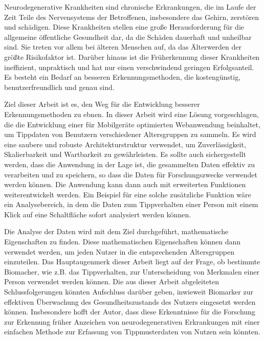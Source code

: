 Neurodegenerative Krankheiten sind chronische Erkrankungen, die im Laufe der Zeit Teile des Nervensystems der Betroffenen, insbesondere das Gehirn, zerstören und schädigen. 
Diese Krankheiten stellen eine große Herausforderung für die allgemeine öffentliche Gesundheit dar, da die Schäden dauerhaft und unheilbar sind. 
Sie treten vor allem bei älteren Menschen auf, da das Älterwerden der größte Risikofaktor ist. 
Darüber hinaus ist die Früherkennung dieser Krankheiten ineffizient, unpraktisch und hat nur einen verschwindend geringen Erfolgsanteil. 
Es besteht ein Bedarf an besseren Erkennungsmethoden, die kostengünstig, benutzerfreundlich und genau sind.

Ziel dieser Arbeit ist es, den Weg für die Entwicklung besserer Erkennungsmethoden zu ebnen.
In dieser Arbeit wird eine Lösung vorgeschlagen, die die Entwicklung einer für Mobilgeräte optimierten Webanwendung beinhaltet, um Tippdaten von Benutzern verschiedener Altersgruppen zu sammeln. 
Es wird eine saubere und robuste Architekturstruktur verwendet, um Zuverlässigkeit, Skalierbarkeit und Wartbarkeit zu gewährleisten. 
Es sollte auch sichergestellt werden, dass die Anwendung in der Lage ist, die gesammelten Daten effektiv zu verarbeiten und zu speichern, so dass die Daten für Forschungszwecke verwendet werden können.
Die Anwendung kann dann auch mit erweiterten Funktionen weiterentwickelt werden. 
Ein Beispiel für eine solche zusätzliche Funktion wäre ein Analysebereich, in dem die Daten zum Tippverhalten einer Person mit einem Klick auf eine Schaltfläche sofort analysiert werden können.

Die Analyse der Daten wird mit dem Ziel durchgeführt, mathematische Eigenschaften zu finden.
Diese mathematischen Eigenschaften können dann verwendet werden, um jeden Nutzer in die entsprechenden Altersgruppen einzuteilen.
Das Hauptaugenmerk dieser Arbeit liegt auf der Frage, ob bestimmte Biomacher, wie z.B. das Tippverhalten, zur Unterscheidung von Merkmalen einer Person verwendet werden können.
Die aus dieser Arbeit abgeleiteten Schlussfolgerungen könnten Aufschluss darüber geben, inwieweit Biomarker zur effektiven Überwachung des Gesundheitszustands des Nutzers eingesetzt werden können.
Insbesondere hofft der Autor, dass diese Erkenntnisse für die Forschung zur Erkennung früher Anzeichen von neurodegenerativen Erkrankungen mit einer einfachen Methode zur Erfassung von Tippmusterdaten von Nutzen sein könnten.